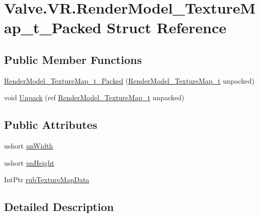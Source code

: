 \hypertarget{struct_valve_1_1_v_r_1_1_render_model___texture_map__t___packed}{}\section{Valve.\+V\+R.\+Render\+Model\+\_\+\+Texture\+Map\+\_\+t\+\_\+\+Packed Struct Reference}
\label{struct_valve_1_1_v_r_1_1_render_model___texture_map__t___packed}
\subsection*{Public Member Functions}
\begin{DoxyCompactItemize}
\item 
\mbox{\hyperlink{struct_valve_1_1_v_r_1_1_render_model___texture_map__t___packed_a11fd82c91415d4544cb134689a333aff}{Render\+Model\+\_\+\+Texture\+Map\+\_\+t\+\_\+\+Packed}} (\mbox{\hyperlink{struct_valve_1_1_v_r_1_1_render_model___texture_map__t}{Render\+Model\+\_\+\+Texture\+Map\+\_\+t}} unpacked)
\item 
void \mbox{\hyperlink{struct_valve_1_1_v_r_1_1_render_model___texture_map__t___packed_ab427abd545c2c0df736ec1b6f4371082}{Unpack}} (ref \mbox{\hyperlink{struct_valve_1_1_v_r_1_1_render_model___texture_map__t}{Render\+Model\+\_\+\+Texture\+Map\+\_\+t}} unpacked)
\end{DoxyCompactItemize}
\subsection*{Public Attributes}
\begin{DoxyCompactItemize}
\item 
ushort \mbox{\hyperlink{struct_valve_1_1_v_r_1_1_render_model___texture_map__t___packed_ae0bb83e7ea96afb706c2d94c1a36408d}{un\+Width}}
\item 
ushort \mbox{\hyperlink{struct_valve_1_1_v_r_1_1_render_model___texture_map__t___packed_a93e86deb3fcb0f7550430b4ed6671b80}{un\+Height}}
\item 
Int\+Ptr \mbox{\hyperlink{struct_valve_1_1_v_r_1_1_render_model___texture_map__t___packed_a62cd8cb0d5b15e0490e08821825c26cb}{rub\+Texture\+Map\+Data}}
\end{DoxyCompactItemize}


\subsection{Detailed Description}


